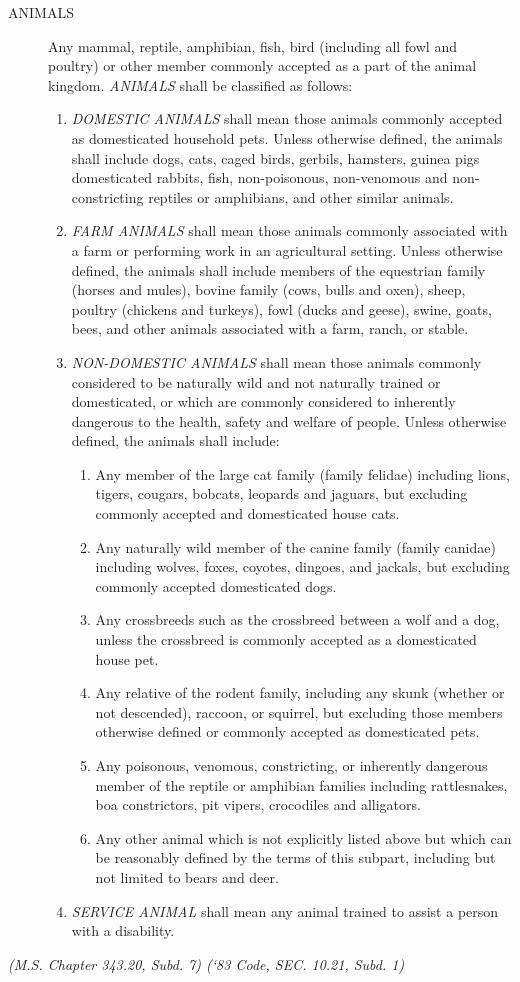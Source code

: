 \begin{description}
\item[ANIMALS] Any mammal, reptile, amphibian, fish, bird (including all fowl and poultry) or other member commonly accepted as a part of the animal kingdom.  \emph{ANIMALS} shall be classified as follows:
\begin{enumerate}[{\indent}1)]
\item \emph{DOMESTIC ANIMALS} shall mean those animals commonly accepted as domesticated household pets.  Unless otherwise defined, the animals shall include dogs, cats, caged birds, gerbils, hamsters, guinea pigs domesticated rabbits, fish, non-poisonous, non-venomous and non-constricting reptiles or amphibians, and other similar animals.
\item \emph{FARM ANIMALS} shall mean those animals commonly associated with a farm or performing work in an agricultural setting.  Unless otherwise defined, the animals shall include members of the equestrian family (horses and mules), bovine family (cows, bulls and oxen), sheep, poultry (chickens and turkeys), fowl (ducks and geese), swine, goats, bees, and other animals associated with a farm, ranch, or stable.
\item \emph{NON-DOMESTIC ANIMALS} shall mean those animals commonly considered to be naturally wild and not naturally trained or domesticated, or which are commonly considered to inherently dangerous to the health, safety and welfare of people.  Unless otherwise defined, the animals shall include:
\begin{enumerate}
\item Any member of the large cat family (family felidae) including lions, tigers, cougars, bobcats, leopards and jaguars, but excluding commonly accepted and domesticated house cats.
\item Any naturally wild member of the canine family (family canidae) including wolves, foxes, coyotes, dingoes, and jackals, but excluding commonly accepted domesticated dogs.
\item Any crossbreeds such as the crossbreed between a wolf and a dog, unless the crossbreed is commonly accepted as a domesticated house pet.
\item Any relative of the rodent family, including any skunk (whether or not descended), raccoon, or squirrel, but excluding those members otherwise defined or commonly accepted as domesticated pets.
\item Any poisonous, venomous, constricting, or inherently dangerous member of the reptile or amphibian families including rattlesnakes, boa constrictors, pit vipers, crocodiles and alligators.
\item Any other animal which is not explicitly listed above but which can be reasonably defined by the terms of this subpart, including but not limited to bears and deer.
\end{enumerate}
\item \emph{SERVICE ANIMAL} shall mean any animal trained to assist a person with a disability.
\end{enumerate}
\end{description}
\emph{(M.S. Chapter 343.20, Subd. 7)  (‘83 Code, SEC. 10.21, Subd. 1)}

